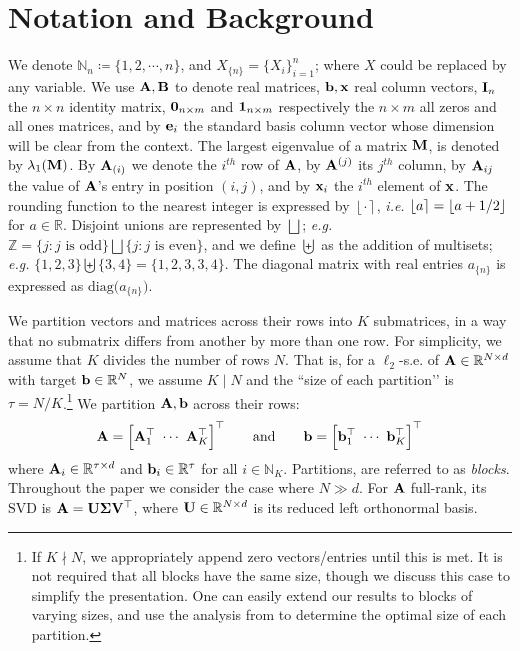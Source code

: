 \documentclass[journal,letterpaper,onecolumn,twoside,nofonttune]{IEEEtran}
\newcommand{\N}{\mathbb{N}}
\newcommand{\Z}{\mathbb{Z}}
\newcommand{\R}{\mathbb{R}}
\newcommand{\bb}{\bold{b}}
\newcommand{\eb}{\bold{e}}
\newcommand{\Ub}{\bold{U}}
\newcommand{\Vb}{\bold{V}}
\newcommand{\xb}{\bold{x}}
\newcommand{\Ab}{\bold{A}}
\newcommand{\Bb}{\bold{B}}
\newcommand{\Ib}{\bold{I}}
\newcommand{\Mb}{\bold{M}}
\newcommand{\Sigb}{\bold{\Sigma}}
\newcommand{\diag}{\mathrm{diag}}
\newcommand{\SVD}{\mathrm{SVD}}
\DeclarePairedDelimiter\floor{\lfloor}{\rfloor}
\begin{document}
\section{Notation and Background}
\label{not_backgr_sec}

We denote $\N_n\coloneqq\{1,2,\cdots,n\}$, and $X_{\{n\}}=\{X_i\}_{i=1}^n$; where $X$ could be replaced by any variable. We use $\Ab,\Bb$ to denote real matrices, $\bb,\xb$ real column vectors, $\Ib_n$ the $n\times n$ identity matrix, $\bold{0}_{n\times m}$ and $\bold{1}_{n\times m}$ respectively the $n\times m$ all zeros and all ones matrices, and by $\eb_i$ the standard basis column vector whose dimension will be clear from the context. The largest eigenvalue of a matrix $\Mb$, is denoted by $\lambda_1(\Mb)$. By $\Ab_{(i)}$ we denote the $i^{th}$ row of $\Ab$, by $\Ab^{(j)}$ its $j^{th}$ column, by $\Ab_{ij}$ the value of $\Ab$'s entry in position $(i,j)$, and by $\xb_i$ the $i^{th}$ element of $\xb$. The rounding function to the nearest integer is expressed by $\left\lfloor\cdot\right\rceil$, \textit{i.e.} $\left\lfloor a\right\rceil=\floor{a+1/2}$ for $a\in\R$. Disjoint unions are represented by $\bigsqcup$; \textit{e.g.} $\Z=\{j:j\text{ is odd}\}\bigsqcup\{j:j\text{ is even}\}$, and we define $\biguplus$ as the addition of multisets; \textit{e.g.} $\{1,2,3\}\biguplus\{3,4\}=\{1,2,3,3,4\}$. The diagonal matrix with real entries $a_{\{n\}}$ is expressed as $\diag\big(a_{\{n\}})$.

We partition vectors and matrices across their rows into $K$ submatrices, in a way that no submatrix differs from another by more than one row. For simplicity, we assume that $K$ divides the number of rows $N$. That is, for a $\ell_2$-s.e. of $\Ab\in\R^{N\times d}$ with target $\bb\in\R^N$, we assume $K\mid N$ and the ``size of each partition’’ is $\tau=N/K$.\footnote{If $K\nmid N$, we appropriately append zero vectors/entries until this is met. It is not required that all blocks have the same size, though we discuss this case to simplify the presentation. One can easily extend our results to blocks of varying sizes, and use the analysis from \cite{CMH20} to determine the optimal size of each partition.} We partition $\Ab,\bb$ across their rows:
\begin{equation}
\label{part_matrix}
  \Ab = \Big[\Ab_1^\top \ \cdots \ \Ab_K^\top\Big]^\top \qquad \text{and} \qquad \bb = \Big[\bb_1^\top \ \cdots \ \bb_K^\top\Big]^\top
\end{equation}
where $\Ab_i\in\R^{\tau\times d}$ and $\bb_i\in\R^{\tau}$ for all $i\in\N_K$. Partitions, are referred to as \textit{blocks}. Throughout the paper we consider the case where $N\gg d$. For $\Ab$ full-rank, its $\SVD$ is $\Ab=\Ub\Sigb\Vb^\top$, where $\Ub\in\R^{N\times d}$ is its reduced left orthonormal basis.
\end{document}
